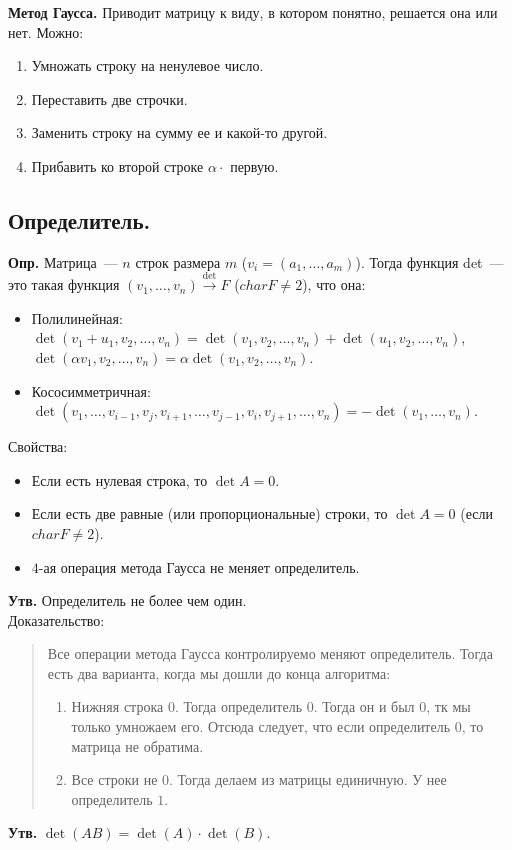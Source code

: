 \documentclass{article}
\begin{document}
	\textbf{Метод Гаусса.} Приводит матрицу к виду, в котором понятно, решается она или нет. Можно:
	\begin{enumerate}
		\item Умножать строку на ненулевое число.
		\item Переставить две строчки.
		\item Заменить строку на сумму ее и какой-то другой.
		\item Прибавить ко второй строке $\alpha \cdot$ первую.
	\end{enumerate}
	\subsection{Определитель.}
	\textbf{Опр.} Матрица~--- $n$ строк размера $m$ ($v_i = (a_1, \dots, a_m)$). Тогда функция det~--- это такая функция $(v_1, \dots, v_n) \xrightarrow{\det} F$ ($char F \not= 2$), что она:
	\begin{itemize}
		\item Полилинейная: $\det(v_1 + u_1, v_2, \dots, v_n) = \det(v_1, v_2, \dots, v_n) + \det(u_1, v_2, \dots, v_n)$, $\det(\alpha v_1, v_2, \dots, v_n) = \alpha \det(v_1, v_2, \dots, v_n)$.
		\item Кососимметричная: $\det(v_1, \dots, v_{i - 1}, v_j, v_{i + 1}, \dots, v_{j - 1}, v_i, v_{j + 1}, \dots, v_n) = -\det(v_1, \dots, v_n)$.
	\end{itemize}
	Свойства:
	\begin{itemize}
		\item Если есть нулевая строка, то $\det A = 0$.
		\item Если есть две равные (или пропорциональные) строки, то $\det A = 0$ (если $char F \not= 2$).
		\item $4$-ая операция метода Гаусса не меняет определитель.
	\end{itemize}
	\textbf{Утв.} Определитель не более чем один. \\
	Доказательство:
	\begin{quote}
		Все операции метода Гаусса контролируемо меняют определитель. Тогда есть два варианта, когда мы дошли до конца алгоритма:
		\begin{enumerate}
			\item Нижняя строка $0$. Тогда определитель $0$. Тогда он и был $0$, тк мы только умножаем его. Отсюда следует, что если определитель $0$, то матрица не обратима.
			\item Все строки не $0$. Тогда делаем из матрицы единичную. У нее определитель $1$.
		\end{enumerate}
	\end{quote}
	\textbf{Утв.} $\det(AB) = \det(A) \cdot \det(B)$.
	
\end{document}
